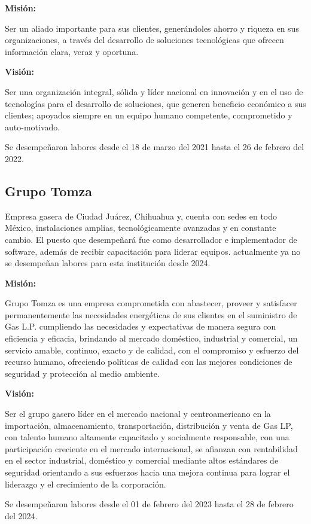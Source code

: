 \documentclass[protocolo.tex]{subfiles}
\begin{document}
\textbf{Misión:}

Ser un aliado importante para sus clientes, generándoles ahorro y riqueza en sus organizaciones, a través del desarrollo de soluciones tecnológicas que ofrecen información clara, veraz y oportuna.\vspace{5mm} 


\textbf{Visión:}

Ser una organización integral, sólida y líder nacional en innovación y en el uso de tecnologías para el desarrollo de soluciones, que generen beneficio económico a sus clientes; apoyados siempre en un equipo humano competente, comprometido y auto-motivado.\vspace{5mm}


Se desempeñaron labores desde el 18 de marzo del 2021 hasta el 26 de febrero del 2022.





\subsection{Grupo Tomza}
Empresa gasera de Ciudad Juárez, Chihuahua y, cuenta con sedes en todo México, instalaciones amplias, 
tecnológicamente avanzadas y en constante cambio.
El puesto que desempeñará fue como desarrollador e implementador de software, 
además de recibir capacitación para liderar equipos. 
actualmente ya no se desempeñan labores para esta institución desde 2024.\vspace{5mm} 

\textbf{Misión:}

Grupo Tomza es una empresa comprometida con abastecer, proveer y satisfacer permanentemente las necesidades energéticas de sus clientes en el suministro de Gas L.P. cumpliendo las necesidades y expectativas de manera segura con eficiencia y eficacia, brindando al mercado doméstico, industrial y comercial, un servicio amable, continuo, exacto y de calidad, con el compromiso y esfuerzo del recurso humano, ofreciendo políticas de calidad con las mejores condiciones de seguridad y protección al medio ambiente.\vspace{5mm} 

\textbf{Visión:} 

Ser el grupo gasero líder en el mercado nacional y centroamericano en la importación, almacenamiento, transportación, distribución y venta de Gas LP, con talento humano altamente capacitado y socialmente responsable, con una participación creciente en el mercado internacional, se afianzan con rentabilidad en el sector industrial, doméstico y comercial mediante altos estándares de seguridad orientando a sus esfuerzos hacia una mejora continua para lograr el liderazgo y el crecimiento de la corporación.\vspace{5mm} 

Se desempeñaron labores desde el 01 de febrero del 2023 hasta el 28 de febrero del 2024.
\end{document}

